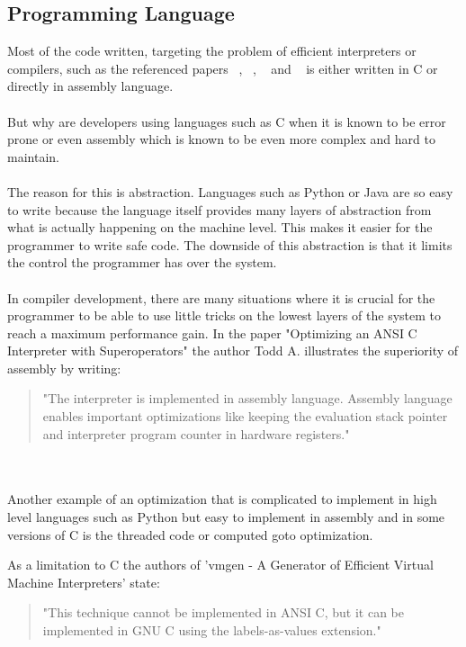 \documentclass{article}
\begin{document}
\subsection{Programming Language}
Most of the code written, targeting the problem of efficient interpreters or
compilers, such as the referenced papers ~\cite{vmgen}, ~\cite{modern},
~\cite{superoperators} and ~\cite{stack_caching_for_interpreters} is either
written in C or directly in assembly language. 
\\\\
But why are developers using languages such as C when it is known to be error
prone or even assembly which is known to be even more complex and hard to
maintain.
\\\\
The reason for this is abstraction. Languages such as Python or Java are so
easy to write because the language itself provides many layers of abstraction
from what is actually happening on the machine level. This makes it easier for
the programmer to write safe code. The downside of this abstraction is that it
limits the control the programmer has over the system. ~\cite{abstraction}
\\\\
In compiler development, there are many situations where it is crucial for the
programmer to be able to use little tricks on the lowest layers of the system
to reach a maximum performance gain. In the paper "Optimizing an ANSI C
Interpreter with Superoperators" the author Todd A. illustrates the superiority
of assembly by writing:

\begin{quotation}
"The interpreter is implemented in assembly language.
Assembly language enables important optimizations like keeping the evaluation
stack pointer and interpreter program counter in hardware registers." ~\cite{superoperators}
\end{quotation}
\\\\
Another example of an optimization that is complicated to implement in high
level languages such as Python but easy to implement in assembly and in some
versions of C is the threaded code or computed goto optimization.

As a limitation to C the authors of 'vmgen - A Generator of Efficient Virtual
Machine Interpreters' state:
\begin{quotation} 
"This technique cannot be implemented in ANSI C, but it can be implemented in
GNU C using the labels-as-values extension." ~\cite{vmgen} 
\end{quotation}
\end{document}
